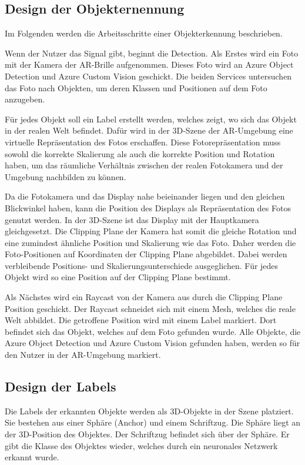 \subsection{Design der Objekternennung}

Im Folgenden werden die Arbeitsschritte einer Objekterkennung beschrieben.

Wenn der Nutzer das Signal gibt, beginnt die Detection. Als Erstes wird ein Foto mit der Kamera der AR-Brille aufgenommen. Dieses Foto wird an Azure Object Detection und Azure Custom Vision geschickt.
Die beiden Services untersuchen das Foto nach Objekten, um deren Klassen und Positionen auf dem Foto anzugeben.

Für jedes Objekt soll ein Label erstellt werden, welches zeigt, wo sich das Objekt in der realen Welt befindet.
Dafür wird in der 3D-Szene der AR-Umgebung eine virtuelle Repräsentation des Fotos erschaffen. Diese Fotorepräsentation muss sowohl die korrekte Skalierung als auch die korrekte Position und Rotation haben, um das räumliche Verhältnis zwischen der realen Fotokamera und der Umgebung nachbilden zu können.

Da die Fotokamera und das Display nahe beieinander liegen und den gleichen Blickwinkel haben, kann die Position des Displays als Repräsentation des Fotos genutzt werden. In der 3D-Szene ist das Display mit der Hauptkamera gleichgesetzt. Die Clipping Plane der Kamera hat somit die gleiche Rotation und eine zumindest ähnliche Position und Skalierung wie das Foto. Daher werden die Foto-Positionen auf Koordinaten der Clipping Plane abgebildet. Dabei werden verbleibende Positions- und Skalierungsunterschiede ausgeglichen. Für jedes Objekt wird so eine Position auf der Clipping Plane bestimmt.

Als Nächstes wird ein Raycast von der Kamera aus durch die Clipping Plane Position geschickt. Der Raycast schneidet sich mit einem Mesh, welches die reale Welt abbildet. Die getroffene Position wird mit einem Label markiert. Dort befindet sich das Objekt, welches auf dem Foto gefunden wurde. Alle Objekte, die Azure Object Detection und Azure Custom Vision gefunden haben, werden so für den Nutzer in der AR-Umgebung markiert.

\subsection{Design der Labels}

Die Labels der erkannten Objekte werden als 3D-Objekte in der Szene platziert. Sie bestehen aus einer Sphäre (Anchor) und einem Schriftzug. Die Sphäre liegt an der 3D-Position des Objektes. Der Schriftzug befindet sich über der Sphäre. Er gibt die Klasse des Objektes wieder, welches durch ein neuronales Netzwerk erkannt wurde.

